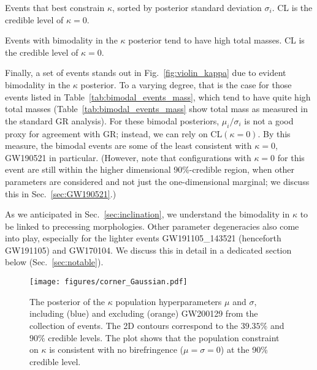 \documentclass[aps,prd,twocolumn,superscriptaddress,preprintnumbers,floatfix,nofootinbib]{revtex4-2}
\begin{document}
\begin{table}
    \caption{Events that best constrain $\kappa$, sorted by posterior standard deviation $\sigma_i$. CL is the credible level of $\kappa = 0$.}
    \begin{ruledtabular}
    \end{ruledtabular}
    \label{tab:best_events_kappa}
\end{table}

\begin{table}
    \caption{Events with bimodality in the $\kappa$ posterior tend to have high total masses. CL is the credible level of $\kappa = 0$.}
    \begin{ruledtabular}
    \end{ruledtabular}
    \label{tab:bimodal_events_mass}
\end{table}

Finally, a set of events stands out in Fig.~\ref{fig:violin_kappa} due to evident bimodality in the $\kappa$ posterior.
To a varying degree, that is the case for those events listed in Table~\ref{tab:bimodal_events_mass}, which tend to have quite high total masses (Table~\ref{tab:bimodal_events_mass} show total mass as measured in the standard  \ac{GR} analysis).
For these bimodal posteriors, $\mu_i/\sigma_i$ is not a good proxy for agreement with \ac{GR}; instead, we can rely on $\mathrm{CL}(\kappa = 0)$.
By this measure, the bimodal events are some of the least consistent with $\kappa = 0$, GW190521 in particular. (However, note that configurations with $\kappa = 0$ for this event are still within the higher dimensional 90\%-credible region, when other parameters are considered and not just the one-dimensional marginal; we discuss this in Sec.~\ref{sec:GW190521}.)

As we anticipated in Sec.~\ref{sec:inclination}, we understand the bimodality in $\kappa$ to be linked to precessing morphologies. Other parameter degeneracies also come into play, especially for the lighter events GW191105\_143521 (henceforth GW191105) and GW170104.
We discuss this in detail in a dedicated section below (Sec.~\ref{sec:notable}).

\begin{figure}
    \texttt{[image: figures/corner\_Gaussian.pdf]}
    \caption{
        The posterior of the $\kappa$ population hyperparameters $\mu$ and $\sigma$, including (blue) and excluding (orange) GW200129 from the collection of events.
        The 2D contours correspond to the $39.35\%$ and $90\%$ credible levels.
        The plot shows that the population constraint on $\kappa$ is consistent with no birefringence ($\mu=\sigma=0$) at the 90\% credible level.
    }
    \label{fig:corner_Gaussian}
\end{figure}
\end{document}
